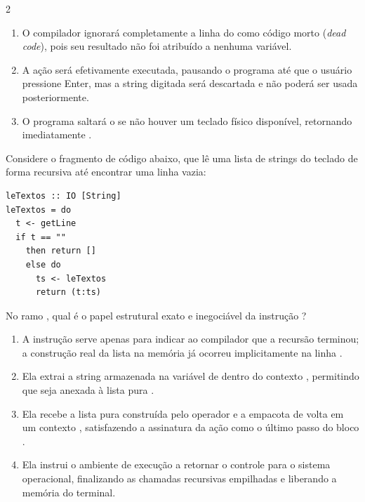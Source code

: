 \documentclass[a4paper,10pt,brazil]{article}
\begin{document}
\begin{multicols}{2}
\begin{enumerate}
  \item O compilador ignorará completamente a linha do  como código morto (\emph{dead code}), pois seu resultado não foi atribuído a nenhuma variável.

  \item A ação  será efetivamente executada, pausando o programa até que o usuário pressione Enter, mas a string digitada será descartada e não poderá ser usada posteriormente.

  \item O programa saltará o  se não houver um teclado físico disponível, retornando imediatamente .


\end{enumerate}

Considere o fragmento de código abaixo, que lê uma lista de strings do teclado de forma recursiva até encontrar uma linha vazia:

\begin{verbatim}
leTextos :: IO [String]
leTextos = do
  t <- getLine
  if t == "" 
    then return []
    else do
      ts <- leTextos
      return (t:ts)
\end{verbatim}

No ramo , qual é o papel estrutural exato e inegociável da instrução ?

\begin{enumerate}
  \item A instrução  serve apenas para indicar ao compilador que a recursão terminou; a construção real da lista na memória já ocorreu implicitamente na linha .

  \item Ela extrai a string armazenada na variável  de dentro do contexto , permitindo que seja anexada à lista pura .

  \item Ela recebe a lista pura construída pelo operador \haskellinline{(:)} e a empacota de volta em um contexto , satisfazendo a assinatura da ação como o último passo do bloco .

  \item Ela instrui o ambiente de execução a retornar o controle para o sistema operacional, finalizando as chamadas recursivas empilhadas e liberando a memória do terminal.


\end{enumerate}
\end{multicols}
\end{document}
